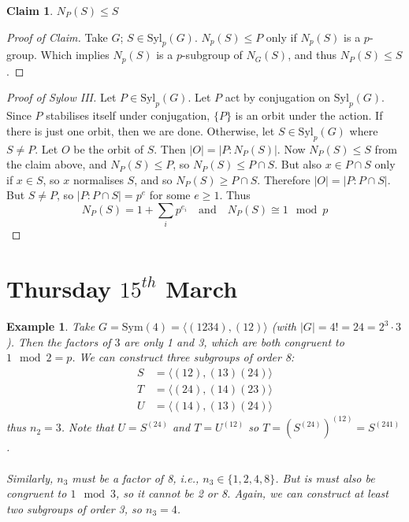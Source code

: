\documentclass[a4paper,10pt]{article}
\newtheorem{cl}[thm]{Claim}
\newtheorem{eg}[thm]{Example}
\begin{document}
\begin{cl}
$N_P(S) \leq S$
\end{cl}
\begin{proof}[Proof of Claim]
Take $G$; $S \in \text{Syl}_p(G)$. $N_p(S) \leq P$ only if $N_p(S)$ is a $p$-group. Which implies $N_p(S)$ is a $p$-subgroup of $N_G(S)$, and thus $N_P(S) \leq S$. 
\end{proof}

\begin{proof}[Proof of Sylow III]
Let $P \in \text{Syl}_p(G)$. Let $P$ act by conjugation on $\text{Syl}_p(G)$. Since $P$ stabilises itself under conjugation, $\{P\}$ is an orbit under the action. If there is just one orbit, then we are done. Otherwise, let $S \in \text{Syl}_p(G)$ where $S \neq P$. Let $O$ be the orbit of $S$. Then $|O| = |P : N_P(S)|$. Now $N_P(S) \leq S$ from the claim above, and $N_P(S) \leq P$, so $N_P(S) \leq P \cap S$. But also $x \in P \cap S$ only if $x \in S$, so $x$ normalises $S$, and so $N_P(S) \geq P \cap S$. Therefore $|O| = |P : P\cap S|$. But $S \neq P$, so $|P : P \cap S| = p^e$ for some $e \geq 1$. Thus
\[ N_P(S) = 1 + \sum_i p^{e_i} \quad \text{and} \quad N_P(S) \cong 1 \mod p \]
\end{proof}

\newpage
\section{Thursday $15^{th}$ March}

\begin{eg}
Take $G = \text{Sym}(4) = \langle (1234), (12) \rangle$ (with $|G| = 4! = 24 = 2^3 \cdot 3$). Then the factors of $3$ are only 1 and 3, which are both congruent to $1\mod 2 = p$. We can construct three subgroups of order 8:
\begin{align*}
S &= \langle (12), (13)(24) \rangle \\
T &= \langle (24), (14)(23) \rangle \\
U &= \langle (14), (13)(24) \rangle
\end{align*}
thus $n_2 = 3$. Note that $U = S^{(24)}$ and $T = U^{(12)}$ so $T = (S^{(24)})^{(12)}= S^{(241)}$. \\
\\
Similarly, $n_3$ must be a factor of 8, i.e., $n_3 \in \{1,2,4,8\}$. But is must also be congruent to $1 \mod 3$, so it cannot be 2 or 8. Again, we can construct at least two subgroups of order 3, so $n_3 = 4$. 

\end{eg}
\end{document}
